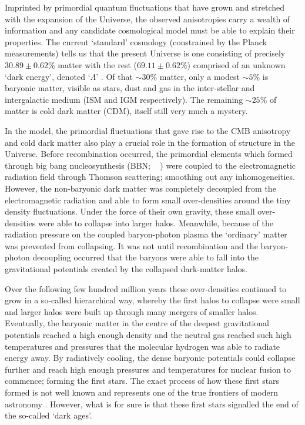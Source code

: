 Imprinted by primordial quantum fluctuations that have grown and stretched with the expansion of the Universe, the observed anisotropies carry a wealth of information and any candidate cosmological model must be able to explain their properties. The current `standard' \cdm{} cosmology (constrained by the Planck measurements) tells us that the present Universe is one consisting of precisely $30.89 \pm 0.62\%$ matter with the rest ($69.11 \pm 0.62\%$) comprised of an unknown `dark energy', denoted `$\Lambda$' \citep{2015arXiv150201589P}. Of that $\sim 30\%$ matter, only a modest $\sim 5\%$ is baryonic matter, visible as stars, dust and gas in the inter-stellar and intergalactic medium (ISM and IGM respectively). The remaining  $\sim 25\%$ of matter is cold dark matter (CDM), itself still very much a mystery.

In the \cdm{} model, the primordial fluctuations that gave rise to the CMB anisotropy and cold dark matter also play a crucial role in the formation of structure in the Universe. Before recombination occurred, the primordial elements which formed through big bang nucleosynthesis (BBN; \citeauthor{Burles:2001kr}~ \citeyear{Burles:2001kr}) were coupled to the electromagnetic radiation field through Thomson scattering; smoothing out any inhomogeneities. However, the non-baryonic dark matter was completely decoupled from the electromagnetic radiation and able to form small over-densities around the tiny density fluctuations. Under the force of their own gravity, these small over-densities were able to collapse into larger halos. Meanwhile, because of the radiation pressure on the coupled baryon-photon plasma the `ordinary' matter was prevented from collapsing. It was not until recombination and the baryon-photon decoupling occurred that the baryons were able to fall into the gravitational potentials created by the collapsed dark-matter halos.

Over the following few hundred million years these over-densities continued to grow in a so-called hierarchical way, whereby the first halos to collapse were small and larger halos were built up through many mergers of smaller halos. Eventually, the baryonic matter in the centre of the deepest gravitational potentials reached a high enough density and the neutral gas reached such high temperatures and pressures that the molecular hydrogen was able to radiate energy away. By radiatively cooling, the dense baryonic potentials could collapse further and reach high enough pressures and temperatures for nuclear fusion to commence; forming the first stars. The exact process of how these first stars formed is not well known and represents one of the true frontiers of modern astronomy \citep{Bromm:2013dk}. However, what is for sure is that these first stars signalled the end of the so-called `dark ages'.

